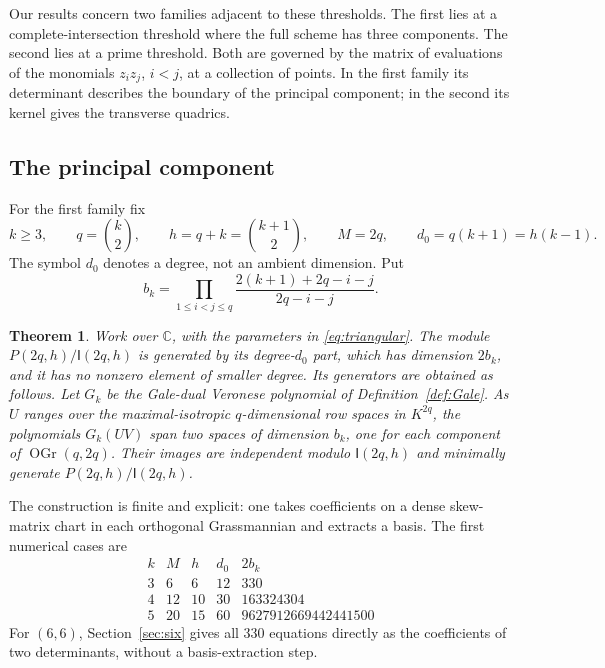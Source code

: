 \documentclass[11pt]{article}
\newtheorem{theorem}{Theorem}[section]
\theoremstyle{definition}
\theoremstyle{remark}
\numberwithin{equation}{section}
\DeclareMathOperator{\OGr}{OGr}
\newcommand{\CC}{\mathbb C}
\newcommand{\II}{\mathsf I}
\begin{document}
Our results concern two families adjacent to these thresholds. The first
lies at a complete-intersection threshold where the full scheme has
three components. The second lies at a prime threshold. Both are governed
by the matrix of evaluations of the monomials $z_i z_j$, $i<j$, at a
collection of points. In the first family its determinant describes the
boundary of the principal component; in the second its kernel gives
the transverse quadrics.

\subsection{The principal component}

For the first family fix
\begin{equation}\label{eq:triangular}
 k\geq3,\qquad q=\binom{k}{2},\qquad
 h=q+k=\binom{k+1}{2},\qquad M=2q,
 \qquad d_0=q(k+1)=h(k-1).
\end{equation}
The symbol $d_0$ denotes a degree, not an ambient dimension. Put
\begin{equation}\label{eq:generator-number}
 b_k=\prod_{1\leq i<j\leq q}
       \frac{2(k+1)+2q-i-j}{2q-i-j}.
\end{equation}

\begin{theorem}\label{thm:ideal-intro}
Work over $\CC$, with the parameters in \eqref{eq:triangular}.
The module $P(2q,h)/\II(2q,h)$ is generated by its degree-$d_0$ part,
which has dimension $2b_k$, and it has no nonzero element of smaller
degree. Its generators are obtained as follows. Let $G_k$ be the
Gale-dual Veronese polynomial of Definition~\ref{def:Gale}. As $U$ ranges
over the maximal-isotropic $q$-dimensional row spaces in $K^{2q}$, the
polynomials $G_k(UV)$ span two spaces of dimension $b_k$, one for each
component of $\OGr(q,2q)$. Their images are independent modulo
$\II(2q,h)$ and minimally generate $P(2q,h)/\II(2q,h)$.
\end{theorem}

The construction is finite and explicit: one takes coefficients on a
dense skew-matrix chart in each orthogonal Grassmannian and extracts
a basis. The first numerical cases are
\[
\begin{array}{c|r|r|r|r}
 k&M&h&d_0&2b_k\\\hline
 3&6&6&12&330\\
 4&12&10&30&163324304\\
 5&20&15&60&9627912669442441500
\end{array}
\]
For $(6,6)$, Section~\ref{sec:six} gives all $330$ equations directly
as the coefficients of two determinants, without a basis-extraction step.
\end{document}
